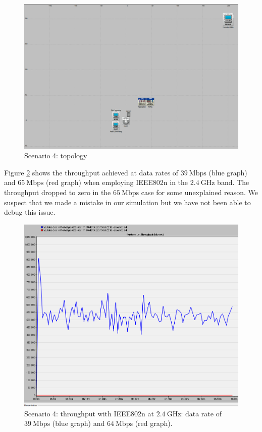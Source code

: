 \begin{figure}[H]
	\centering
	\includegraphics[scale=0.278]{Figures/amantianrenamed/scenario4topo.png}
	\caption{Scenario 4: topology}
	\label{fig:4:1}
\end{figure}

Figure \ref{fig:4:2} shows the throughput achieved at data rates of $39~\mathrm{Mbps}$ (blue graph) and $65~\mathrm{Mbps}$ (red graph) when employing \gls{IEEE802}n in the $2.4~\mathrm{GHz}$ band. The throughput dropped to zero in the $65~\mathrm{Mbps}$ case for some unexplained reason. We suspect that we made a mistake in our simulation but we have not been able to debug this issue.

\begin{figure}[H]
	\centering
	\includegraphics[scale=0.3]{Figures/amantianrenamed/Scenario4Throughputof802.11n39Mbps.4GHzand802.11n65Mbps2.4GHz.png}
	\caption[Scenario 4: throughput at data rates of $39~\mathrm{Mbps}$ and $65~\mathrm{Mbps}$]{Scenario 4: throughput with \gls{IEEE802}n at $2.4~\mathrm{GHz}$: data rate of $39~\mathrm{Mbps}$ (blue graph) and $64~\mathrm{Mbps}$ (red graph).}
	\label{fig:4:2}
\end{figure}

